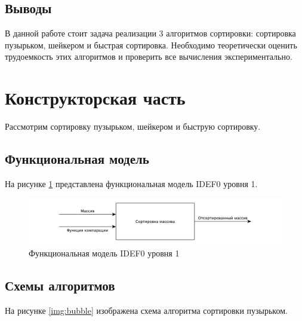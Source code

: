 \documentclass[a4paper,12pt]{article}
\begin{document}
\subsection{Выводы}

В данной работе стоит задача реализации 3 алгоритмов сортировки: сортировка пузырьком,
шейкером и быстрая сортировка. Необходимо теоретически оценить трудоемкость этих алгоритмов
и проверить все вычисления экспериментально.

\newpage
\section{Конструкторская часть}

Рассмотрим сортировку пузырьком, шейкером и быструю сортировку.

\subsection{Функциональная модель}

На рисунке \ref{img:IDEF0} представлена функциональная модель IDEF0 уровня 1.

\begin{figure}[H]
    \centering
    \includegraphics[scale=0.5]{IDEF0}
    \caption{Функциональная модель IDEF0 уровня 1}
    \label{img:IDEF0}
\end{figure}

\subsection{Схемы алгоритмов}

На рисунке \ref{img:bubble} изображена схема алгоритма сортировки пузырьком.
\end{document}
